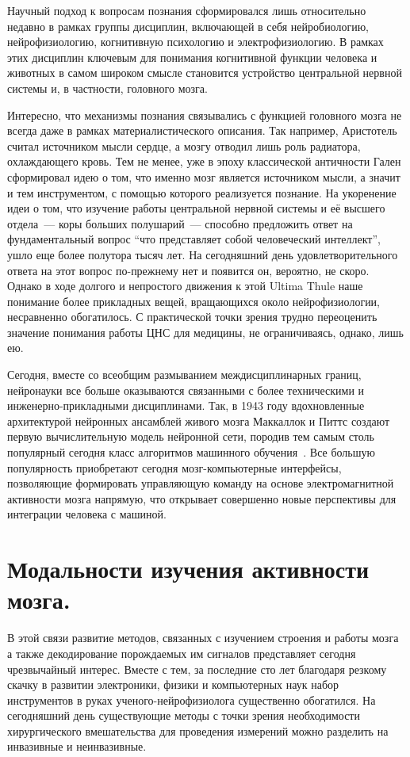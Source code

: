 Научный подход к вопросам познания сформировался лишь относительно недавно в рамках группы
дисциплин, включающей в себя нейробиологию, нейрофизиологию, когнитивную психологию и
электрофизиологию. В рамках этих дисциплин ключевым для понимания когнитивной функции человека
и животных в самом широком смысле становится устройство центральной нервной системы и, в частности,
головного мозга.

Интересно, что механизмы познания связывались с функцией головного мозга не
всегда даже в рамках материалистического описания. Так например, Аристотель
считал источником мысли сердце, а мозгу отводил лишь роль радиатора,
охлаждающего кровь. Тем не менее, уже в эпоху классической античности Гален
сформировал идею о том, что именно мозг является источником мысли, а значит и
тем инструментом, с помощью которого реализуется познание.  На укоренение идеи
о том, что изучение работы центральной нервной системы и её высшего отдела~---
коры больших полушарий~--- способно предложить ответ на фундаментальный вопрос
“что представляет собой человеческий интеллект”, ушло еще более полутора тысяч
лет.  На сегодняшний день удовлетворительного ответа на этот вопрос по-прежнему
нет и появится он, вероятно, не скоро. Однако в ходе  долгого и непростого
движения к этой Ultima Thule наше понимание более прикладных вещей, вращающихся
около нейрофизиологии, несравненно обогатилось.  С практической точки зрения
трудно переоценить значение понимания работы ЦНС для медицины, не
ограничиваясь, однако, лишь ею.

Сегодня, вместе со всеобщим размыванием междисциплинарных границ, нейронауки
все больше оказываются связанными с более техническими и инженерно-прикладными
дисциплинами.  Так, в 1943 году вдохновленные архитектурой нейронных ансамблей
живого мозга Маккаллок и Питтс создают первую вычислительную модель нейронной
сети, породив тем самым столь популярный сегодня класс алгоритмов машинного
обучения~\cite{McCulloch}. Все большую популярность приобретают сегодня
мозг-компьютерные интерфейсы, позволяющие формировать управляющую команду на
основе электромагнитной активности мозга напрямую, что открывает совершенно
новые перспективы для интеграции человека с машиной.

\section{Модальности изучения активности мозга.}

В этой связи развитие методов, связанных с изучением строения и работы мозга а
также декодирование порождаемых им сигналов представляет сегодня чрезвычайный
интерес.  Вместе с тем, за последние сто лет благодаря резкому скачку в
развитии электроники, физики и компьютерных наук набор инструментов в руках
ученого-нейрофизиолога существенно обогатился.  На сегодняшний день
существующие методы с точки зрения необходимости хирургического вмешательства
для проведения измерений можно разделить на инвазивные и неинвазивные.

